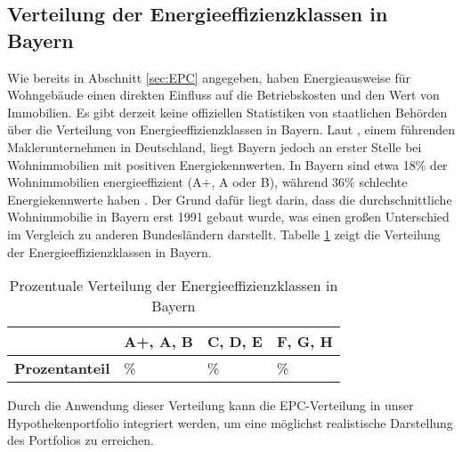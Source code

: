 \subsection{Verteilung der Energieeffizienzklassen in Bayern}
Wie bereits in Abschnitt \ref{sec:EPC} angegeben, haben Energieausweise für Wohngebäude einen direkten Einfluss auf die Betriebskosten und den Wert von Immobilien. Es gibt derzeit keine offiziellen Statistiken von staatlichen Behörden über die Verteilung von Energieeffizienzklassen in Bayern. Laut \textcite{mcmakler2022}, einem führenden Maklerunternehmen in Deutschland, liegt Bayern jedoch an erster Stelle bei Wohnimmobilien mit positiven Energiekennwerten. In Bayern sind etwa 18\% der Wohnimmobilien energieeffizient (A+, A oder B), während 36\% schlechte Energiekennwerte haben \parencite{mcmakler2022}. Der Grund dafür liegt darin, dass die durchschnittliche Wohnimmobilie in Bayern erst 1991 gebaut wurde, was einen großen Unterschied im Vergleich zu anderen Bundesländern darstellt. Tabelle \ref{tab:epc_bayern} zeigt die Verteilung der Energieeffizienzklassen in Bayern.
\begin{table}[htbp]
    \centering
    \caption{Prozentuale Verteilung der Energieeffizienzklassen in Bayern}
    \label{tab:epc_bayern}
    \begin{tabularx}{\textwidth}{>{\raggedright\arraybackslash}X >{\centering\arraybackslash}X >{\centering\arraybackslash}X >{\centering\arraybackslash}X}
        \toprule
        & \textbf{A+, A, B} & \textbf{C, D, E} & \textbf{F, G, H} \\
        \midrule
        \textbf{Prozentanteil} & 18\% & 46\% & 36\% \\
        \bottomrule
    \end{tabularx}
\end{table}

Durch die Anwendung dieser Verteilung kann die \ac{EPC}-Verteilung in unser Hypothekenportfolio integriert werden, um eine möglichst realistische Darstellung des Portfolios zu erreichen.

